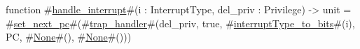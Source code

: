 function #\hyperref[sailRISCVzhandlezyinterrupt]{handle\_interrupt}#(i : InterruptType, del_priv : Privilege) -> unit =
  #\hyperref[sailRISCVzsetzynextzypc]{set\_next\_pc}#(#\hyperref[sailRISCVztrapzyhandler]{trap\_handler}#(del_priv, true, #\hyperref[sailRISCVzinterruptTypezytozybits]{interruptType\_to\_bits}#(i), PC, #\hyperref[sailRISCVzNone]{None}#(), #\hyperref[sailRISCVzNone]{None}#()))

